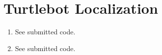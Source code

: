 \documentclass[12pt]{article}
\begin{document}
\section{Turtlebot Localization}
\begin{enumerate}
	\item See submitted code.
	\item See submitted code.
\end{enumerate}
\end{document}
